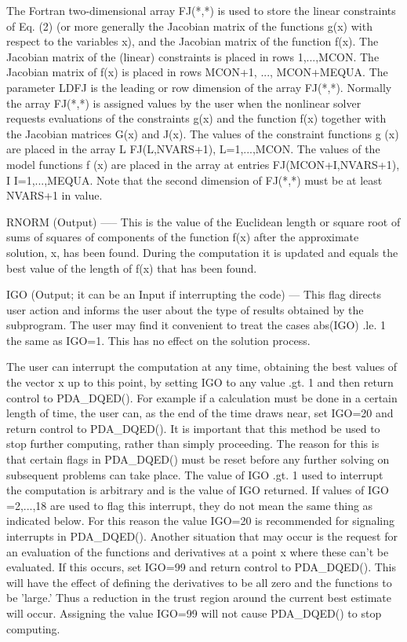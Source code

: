 \documentclass[11pt,twoside,nolof]{starlink}
\begin{document}
\begin{terminalv}
  The  Fortran  two-dimensional array FJ(*,*) is used to store the
  linear  constraints  of  Eq. (2) (or more generally the Jacobian
  matrix  of  the functions g(x) with respect to the variables x),
  and  the  Jacobian  matrix  of  the function f(x).  The Jacobian
  matrix of the (linear) constraints is placed in rows 1,...,MCON.
  The  Jacobian  matrix  of  f(x)  is  placed in rows MCON+1, ...,
  MCON+MEQUA.   The parameter LDFJ is the leading or row dimension
  of  the  array  FJ(*,*).  Normally the array FJ(*,*) is assigned
  values   by   the   user  when  the  nonlinear  solver  requests
  evaluations  of  the  constraints  g(x)  and  the  function f(x)
  together  with  the Jacobian matrices G(x) and J(x).  The values
  of  the  constraint  functions  g (x)  are  placed  in the array
                                   L
  FJ(L,NVARS+1),  L=1,...,MCON.  The values of the model functions
  f (x)  are  placed  in  the array at entries FJ(MCON+I,NVARS+1),
   I
  I=1,...,MEQUA.   Note  that the second dimension of FJ(*,*) must
  be at least NVARS+1 in value.

  RNORM (Output)
  -----
  This is the value of the Euclidean length or square root of sums
  of  squares  of  components  of  the  function  f(x)  after  the
  approximate solution, x, has been found.  During the computation
  it  is  updated  and equals the best value of the length of f(x)
  that has been found.

  IGO (Output; it can be an Input if interrupting the code)
  ---
  This  flag  directs  user  action and informs the user about the
  type  of  results obtained by the subprogram.  The user may find
  it  convenient  to  treat  the cases abs(IGO) .le. 1 the same as
  IGO=1.  This has no effect on the solution process.

  The  user  can  interrupt the computation at any time, obtaining
  the  best  values  of the vector x up to this point,  by setting
  IGO  to any value .gt. 1 and then return control to PDA_DQED().  For
  example  if  a  calculation  must be done in a certain length of
  time,  the  user  can,  as  the  end of the time draws near, set
  IGO=20  and return control to PDA_DQED().  It is important that this
  method  be  used  to  stop further computing, rather than simply
  proceeding.  The reason for this is that certain flags in PDA_DQED()
  must  be reset before any further solving on subsequent problems
  can  take  place.  The value of IGO .gt. 1 used to interrupt the
  computation  is  arbitrary and is the value of IGO returned.  If
  values of IGO =2,...,18 are used to flag this interrupt, they do
  not mean the same thing as indicated below.  For this reason the
  value  IGO=20 is recommended for signaling interrupts in PDA_DQED().
  Another   situation  that  may  occur  is  the  request  for  an
  evaluation  of  the functions and derivatives at a point x where
  these can't be evaluated.  If this occurs, set IGO=99 and return
  control  to  PDA_DQED().   This will have the effect of defining the
  derivatives  to  be  all  zero  and the functions to be 'large.'
  Thus  a  reduction  in  the trust region around the current best
  estimate  will occur.  Assigning the value IGO=99 will not cause
  PDA_DQED() to stop computing.


\end{terminalv}
\end{document}
